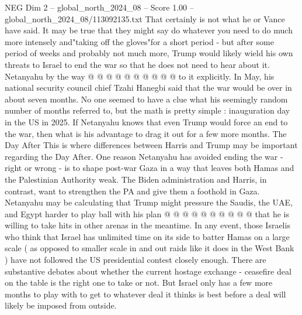 \begin{textsample}{NEG Dim 2 – global\_north\_2024\_08 – Score 1.00 – global\_north\_2024\_08/113092135.txt}
That certainly is not what he or Vance have said.
It may be true that they might say do whatever you need to do much more intensely and"taking off the gloves"for a short period - but after some period of weeks and probably not much more, Trump would likely wield his own threats to Israel to end the war so that he does not need to hear about it.
Netanyahu by the way @ @ @ @ @ @ @ @ @ @ to it explicitly.
In May, his national security council chief Tzahi Hanegbi said that the war would be over in about seven months.
No one seemed to have a clue what his seemingly random number of months referred to, but the math is pretty simple : inauguration day in the US in 2025.
If Netanyahu knows that even Trump would force an end to the war, then what is his advantage to drag it out for a few more months.
The Day After This is where differences between Harris and Trump may be important regarding the Day After.
One reason Netanyahu has avoided ending the war - right or wrong - is to shape post-war Gaza in a way that leaves both Hamas and the Palestinian Authority weak.
The Biden administration and Harris, in contrast, want to strengthen the PA and give them a foothold in Gaza.
Netanyahu may be calculating that Trump might pressure the Saudis, the UAE, and Egypt harder to play ball with his plan @ @ @ @ @ @ @ @ @ @ that he is willing to take hits in other arenas in the meantime.
In any event, those Israelis who think that Israel has unlimited time on its side to batter Hamas on a large scale ( as opposed to smaller scale in and out raids like it does in the West Bank ) have not followed the US presidential contest closely enough.
There are substantive debates about whether the current hostage exchange - ceasefire deal on the table is the right one to take or not.
But Israel only has a few more months to play with to get to whatever deal it thinks is best before a deal will likely be imposed from outside.

\end{textsample}

